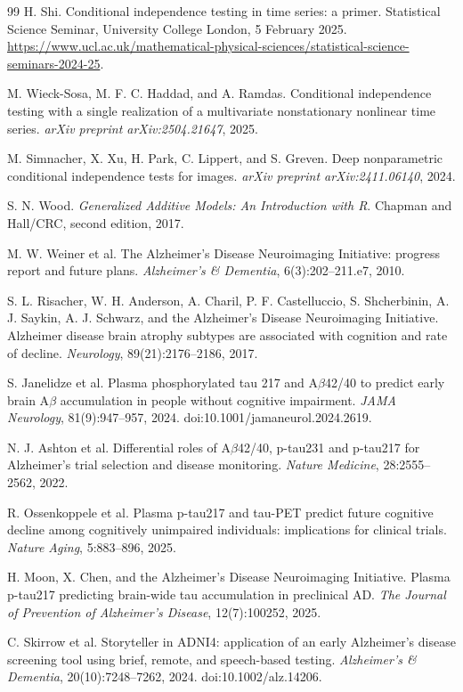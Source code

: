 \documentclass[11pt]{article}
\theoremstyle{definition}
\begin{document}
\begin{thebibliography}{99}
H. Shi.
\newblock Conditional independence testing in time series: a primer.
\newblock Statistical Science Seminar, University College London, 5 February 2025.
\newblock \url{https://www.ucl.ac.uk/mathematical-physical-sciences/statistical-science-seminars-2024-25}.

M. Wieck-Sosa, M. F. C. Haddad, and A. Ramdas.
\newblock Conditional independence testing with a single realization of a multivariate
nonstationary nonlinear time series.
\newblock \emph{arXiv preprint arXiv:2504.21647}, 2025.

M. Simnacher, X. Xu, H. Park, C. Lippert, and S. Greven.
\newblock Deep nonparametric conditional independence tests for images.
\newblock \emph{arXiv preprint arXiv:2411.06140}, 2024.

S. N. Wood.
\newblock \emph{Generalized Additive Models: An Introduction with R}.
\newblock Chapman and Hall/CRC, second edition, 2017.

M. W. Weiner et al.
\newblock The Alzheimer's Disease Neuroimaging Initiative: progress report and future plans.
\newblock \emph{Alzheimer's \& Dementia}, 6(3):202--211.e7, 2010.

S. L. Risacher, W. H. Anderson, A. Charil, P. F. Castelluccio, S. Shcherbinin,
A. J. Saykin, A. J. Schwarz, and the Alzheimer's Disease Neuroimaging Initiative.
\newblock Alzheimer disease brain atrophy subtypes are associated with cognition and rate of decline.
\newblock \emph{Neurology}, 89(21):2176--2186, 2017.

S. Janelidze et al.
\newblock Plasma phosphorylated tau 217 and A$\beta$42/40 to predict early brain
A$\beta$ accumulation in people without cognitive impairment.
\newblock \emph{JAMA Neurology}, 81(9):947--957, 2024.
\newblock doi:10.1001/jamaneurol.2024.2619.

N. J. Ashton et al.
\newblock Differential roles of A$\beta$42/40, p-tau231 and p-tau217 for Alzheimer's trial
selection and disease monitoring.
\newblock \emph{Nature Medicine}, 28:2555--2562, 2022.

R. Ossenkoppele et al.
\newblock Plasma p-tau217 and tau-PET predict future cognitive decline among cognitively
unimpaired individuals: implications for clinical trials.
\newblock \emph{Nature Aging}, 5:883--896, 2025.

H. Moon, X. Chen, and the Alzheimer's Disease Neuroimaging Initiative.
\newblock Plasma p-tau217 predicting brain-wide tau accumulation in preclinical AD.
\newblock \emph{The Journal of Prevention of Alzheimer's Disease}, 12(7):100252, 2025.

C. Skirrow et al.
\newblock Storyteller in ADNI4: application of an early Alzheimer's disease screening tool
using brief, remote, and speech-based testing.
\newblock \emph{Alzheimer's \& Dementia}, 20(10):7248--7262, 2024.
\newblock doi:10.1002/alz.14206.

\end{thebibliography}
\end{document}
